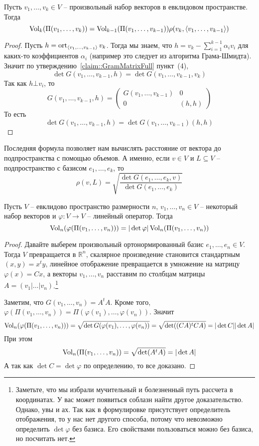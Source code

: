 \begin{claim}
Пусть $v_1,\ldots,v_k\in V$ -- произвольный набор векторов в евклидовом пространстве. Тогда
\[
\operatorname{Vol}_k(\Pi(v_1,\ldots,v_k)) = \operatorname{Vol}_{k-1}(\Pi(v_1,\ldots,v_{k-1}))\rho(v_k, \langle v_1,\ldots,v_{k-1}\rangle)
\] 
\end{claim}
\begin{proof}
Пусть $h = \operatorname{ort}_{\langle v_1,\ldots,v_{k-1}\rangle} v_k$. Тогда мы знаем, что $h = v_k - \sum_{i=1}^{k-1}\alpha_i v_i$ для каких-то коэффициентов $\alpha_i$ (например это следует из алгоритма Грама-Шмидта). Значит по утверждению~\ref{claim::GramMatrixFull} пункт~(4),
\[
\det G(v_1,\ldots,v_{k-1}, h) = \det G(v_1,\ldots,v_{k-1},v_k)
\]
Так как $h \bot v_i$, то 
\[
G(v_1,\ldots,v_{k-1}, h) = 
\begin{pmatrix}
{G(v_1,\ldots,v_{k-1})}&{0}\\
{0}&{(h, h)}
\end{pmatrix}
\]
То есть 
\[
\det G(v_1,\ldots,v_{k-1}, h) = \det G(v_1,\ldots, v_{k-1}) (h, h)
\]
\end{proof}


Последняя формула позволяет нам вычислять расстояние от вектора до подпространства с помощью объемов. А именно, если $v\in V$ и $L\subseteq V$ -- подпространство с базисом $e_1,\ldots,e_k$, то 
\[
\rho(v, L) = \sqrt{\frac{\det G(e_1,\ldots,e_k, v)}{\det G(e_1,\ldots,e_k)}}
\]

\begin{claim}
Пусть $V$ -- евклидово пространство размерности $n$, $v_1,\ldots,v_n\in V$ -- некоторый набор векторов и $\varphi\colon V\to V$ -- линейный оператор. Тогда 
\[
\operatorname{Vol}_n(\varphi(\Pi(v_1,\ldots,v_n))) = |\det \varphi| \operatorname{Vol}_n(\Pi(v_1,\ldots,v_n))
\]
\end{claim}
\begin{proof}
Давайте выберем произвольный ортонормированный базис $e_1,\ldots,e_n\in V$. Тогда $V$ превращается в $\mathbb R^n$, скалярное произведение становится стандартным $(x, y) = x^t y$, линейное отображение превращается в умножение на матрицу $\varphi(x) = Cx$, а векторы $v_1,\ldots,v_n$ расставим по столбцам матрицы $A = (v_1|\ldots|v_n)$.\footnote{Заметьте, что мы избрали мучительный и болезненный путь рассчета в координатах. У вас может появиться соблазн найти другое доказательство. Однако, увы и ах. Так как в формулировке присутствует определитель отображения, то у нас нет другого способа, потому что невозможно определить $\det \varphi$ без базиса. Его свойствами пользоваться можно без базиса, но посчитать нет.}

Заметим, что $G(v_1,\ldots,v_n) = A^t A$. Кроме того, $\varphi(\Pi(v_1,\ldots,v_n)) = \Pi(\varphi(v_1),\ldots,\varphi(v_n))$. Значит
\[
\operatorname{Vol}_n(\varphi(\Pi(v_1,\ldots,v_n))) =\sqrt{\det G(\varphi(v_1),\ldots,\varphi(v_n))} = \sqrt{\det ((CA)^tCA)} = |\det C| |\det A|
\]
При этом 
\[
\operatorname{Vol}_n(\Pi(v_1,\ldots,v_n)) = \sqrt{\det(A^tA)} = |\det A|
\]
А так как $\det C = \det \varphi$ по определению, то все доказано.
\end{proof}

